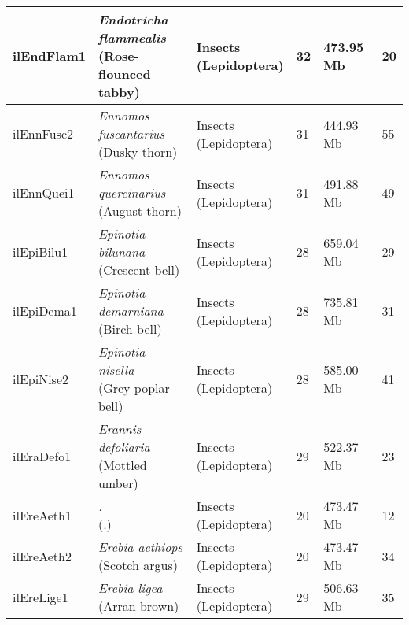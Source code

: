 \begin{centering}
\begin{longtable}{l|l|l|l|l|l}
ilEndFlam1 & \makecell[{l}]{\textit{Endotricha flammealis} \\ (Rose-flounced tabby)} & \makecell[{l}]{Insects \\ (Lepidoptera)} & 32 & 473.95 Mb & 20  \\ \hline
ilEnnFusc2 & \makecell[{l}]{\textit{Ennomos fuscantarius} \\ (Dusky thorn)} & \makecell[{l}]{Insects \\ (Lepidoptera)} & 31 & 444.93 Mb & 55  \\ \hline
ilEnnQuei1 & \makecell[{l}]{\textit{Ennomos quercinarius} \\ (August thorn)} & \makecell[{l}]{Insects \\ (Lepidoptera)} & 31 & 491.88 Mb & 49  \\ \hline
ilEpiBilu1 & \makecell[{l}]{\textit{Epinotia bilunana} \\ (Crescent bell)} & \makecell[{l}]{Insects \\ (Lepidoptera)} & 28 & 659.04 Mb & 29  \\ \hline
ilEpiDema1 & \makecell[{l}]{\textit{Epinotia demarniana} \\ (Birch bell)} & \makecell[{l}]{Insects \\ (Lepidoptera)} & 28 & 735.81 Mb & 31  \\ \hline
ilEpiNise2 & \makecell[{l}]{\textit{Epinotia nisella} \\ (Grey poplar bell)} & \makecell[{l}]{Insects \\ (Lepidoptera)} & 28 & 585.00 Mb & 41  \\ \hline
ilEraDefo1 & \makecell[{l}]{\textit{Erannis defoliaria} \\ (Mottled umber)} & \makecell[{l}]{Insects \\ (Lepidoptera)} & 29 & 522.37 Mb & 23  \\ \hline
ilEreAeth1 & \makecell[{l}]{\textit{.} \\ (.)} & \makecell[{l}]{Insects \\ (Lepidoptera)} & 20 & 473.47 Mb & 12  \\ \hline
ilEreAeth2 & \makecell[{l}]{\textit{Erebia aethiops} \\ (Scotch argus)} & \makecell[{l}]{Insects \\ (Lepidoptera)} & 20 & 473.47 Mb & 34  \\ \hline
ilEreLige1 & \makecell[{l}]{\textit{Erebia ligea} \\ (Arran brown)} & \makecell[{l}]{Insects \\ (Lepidoptera)} & 29 & 506.63 Mb & 35  \\ \hline

\end{longtable}
\end{centering}
